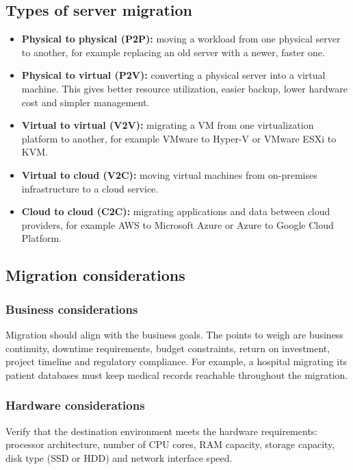 \documentclass[11pt,a4paper]{article}
\begin{document}
\newpage
\subsection{Types of server migration}

\begin{itemize}\itemsep3pt
  \item \textbf{Physical to physical (P2P):} moving a workload from one physical server to
        another, for example replacing an old server with a newer, faster one.
  \item \textbf{Physical to virtual (P2V):} converting a physical server into a virtual
        machine. This gives better resource utilization, easier backup, lower hardware cost
        and simpler management.
  \item \textbf{Virtual to virtual (V2V):} migrating a VM from one virtualization platform to
        another, for example VMware to Hyper-V or VMware ESXi to KVM.
  \item \textbf{Virtual to cloud (V2C):} moving virtual machines from on-premises
        infrastructure to a cloud service.
  \item \textbf{Cloud to cloud (C2C):} migrating applications and data between cloud
        providers, for example AWS to Microsoft Azure or Azure to Google Cloud Platform.
\end{itemize}

\newpage
\subsection{Migration considerations}

\subsubsection{Business considerations}

Migration should align with the business goals. The points to weigh are business continuity,
downtime requirements, budget constraints, return on investment, project timeline and
regulatory compliance. For example, a hospital migrating its patient databases must keep
medical records reachable throughout the migration.

\subsubsection{Hardware considerations}

Verify that the destination environment meets the hardware requirements: processor
architecture, number of CPU cores, RAM capacity, storage capacity, disk type (SSD or HDD) and
network interface speed.
\end{document}
